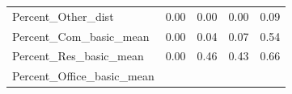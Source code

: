 \documentclass[]{article}
\begin{document}
\begin{longtable}[]{@{}lllll@{}}
\begin{minipage}[t]{0.49\columnwidth}
Percent\_Other\_dist\strut
\end{minipage} & \begin{minipage}[t]{0.08\columnwidth}\raggedright\strut
0.00\strut
\end{minipage} & \begin{minipage}[t]{0.09\columnwidth}\raggedright\strut
0.00\strut
\end{minipage} & \begin{minipage}[t]{0.09\columnwidth}\raggedright\strut
0.00\strut
\end{minipage} & \begin{minipage}[t]{0.11\columnwidth}\raggedright\strut
0.09\strut
\end{minipage}\tabularnewline
\begin{minipage}[t]{0.49\columnwidth}\raggedright\strut
Percent\_Com\_basic\_mean\strut
\end{minipage} & \begin{minipage}[t]{0.08\columnwidth}\raggedright\strut
0.00\strut
\end{minipage} & \begin{minipage}[t]{0.09\columnwidth}\raggedright\strut
0.04\strut
\end{minipage} & \begin{minipage}[t]{0.09\columnwidth}\raggedright\strut
0.07\strut
\end{minipage} & \begin{minipage}[t]{0.11\columnwidth}\raggedright\strut
0.54\strut
\end{minipage}\tabularnewline
\begin{minipage}[t]{0.49\columnwidth}\raggedright\strut
Percent\_Res\_basic\_mean\strut
\end{minipage} & \begin{minipage}[t]{0.08\columnwidth}\raggedright\strut
0.00\strut
\end{minipage} & \begin{minipage}[t]{0.09\columnwidth}\raggedright\strut
0.46\strut
\end{minipage} & \begin{minipage}[t]{0.09\columnwidth}\raggedright\strut
0.43\strut
\end{minipage} & \begin{minipage}[t]{0.11\columnwidth}\raggedright\strut
0.66\strut
\end{minipage}\tabularnewline
\begin{minipage}[t]{0.49\columnwidth}\raggedright\strut
Percent\_Office\_basic\_mean\strut
\end{minipage} & \begin{minipage}[t]{0.08\columnwidth}\raggedright\strut

\end{minipage}
\end{longtable}
\end{document}
